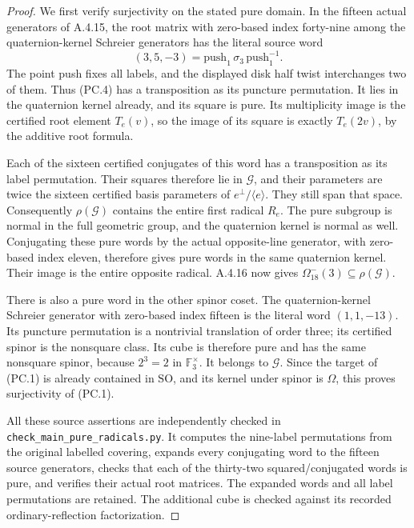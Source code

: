 \begin{proof}
We first verify surjectivity on the stated pure domain.
In the fifteen actual generators of A.4.15, the root matrix
with zero-based index forty-nine among the quaternion-kernel
Schreier generators has the literal source word
\[
               (3,5,-3)
       =\mathrm{push}_1\,\sigma_3\,\mathrm{push}_1^{-1}.
 \tag{PC.4}
\]
The point push fixes all labels, and the displayed disk half
twist interchanges two of them. Thus (PC.4) has a transposition
as its puncture permutation. It lies in the quaternion kernel
already, and its square is pure. Its multiplicity image is
the certified root element \(T_e(v)\), so the image of its
square is exactly \(T_e(2v)\), by the additive root formula.

Each of the sixteen certified conjugates of this word has
a transposition as its label permutation. Their squares
therefore lie in \(\mathcal G\), and their parameters are
twice the sixteen certified basis parameters of
\(e^\perp/\langle e\rangle\). They still span that space.
Consequently \(\rho(\mathcal G)\) contains the entire first
radical \(R_e\). The pure subgroup is normal in the full
geometric group, and the quaternion kernel is normal as well.
Conjugating these pure words by the actual opposite-line
generator, with zero-based index eleven, therefore gives
pure words in the same quaternion kernel. Their image is
the entire opposite radical. A.4.16 now gives
\(\Omega_{18}^-(3)\subseteq\rho(\mathcal G)\).

There is also a pure word in the other spinor coset.
The quaternion-kernel Schreier generator with zero-based
index fifteen is the literal word \((1,1,-13)\).
Its puncture permutation is a nontrivial translation of
order three; its certified spinor is the nonsquare class.
Its cube is therefore pure and has the same nonsquare
spinor, because \(2^3=2\) in \(\mathbb F_3^\times\).
It belongs to \(\mathcal G\). Since the target of (PC.1)
is already contained in \(\mathrm{SO}\), and its kernel
under spinor is \(\Omega\), this proves surjectivity of
(PC.1).

All these source assertions are independently checked in
\texttt{check\_main\_pure\_radicals.py}. It computes the
nine-label permutations from the original labelled covering,
expands every conjugating word to the fifteen source generators,
checks that each of the thirty-two squared/conjugated words
is pure, and verifies their actual root matrices. The expanded
words and all label permutations are retained. The additional
cube is checked against its recorded ordinary-reflection
factorization.


\end{proof}
